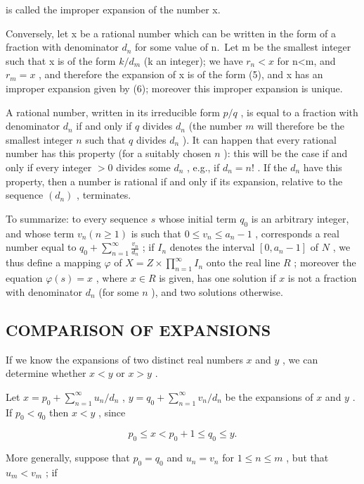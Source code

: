 is called the improper expansion of the number x.

Conversely, let x be a rational number which can be written in the form of a fraction with denominator \(d_{n}\) for some value of n.~Let m be the smallest integer such that x is of the form \(k/d_{m}\) (k an integer); we have \(r_{n}<x\) for n\textless m, and \(r_{m}=x\) , and therefore the expansion of x is of the form (5), and x has an improper expansion given by (6); moreover this improper expansion is unique.

A rational number, written in its irreducible form \(p / q\) , is equal to a fraction with denominator \(d_n\) if and only if \(q\) divides \(d_n\) (the number \(m\) will therefore be the smallest integer \(n\) such that \(q\) divides \(d_n\) ). It can happen that every rational number has this property (for a suitably chosen \(n\) ): this will be the case if and only if every integer \(> 0\) divides some \(d_n\) , e.g., if \(d_n = n!\) . If the \(d_n\) have this property, then a number is rational if and only if its expansion, relative to the sequence \((d_n)\) , terminates.

To summarize: to every sequence \(s\) whose initial term \(q_{0}\) is an arbitrary integer, and whose term \(v_{n}(n \geqslant 1)\) is such that \(0 \leqslant v_{n} \leqslant a_{n} - 1\) , corresponds a real number equal to \(q_{0} + \sum_{n=1}^{\infty} \frac{v_{n}}{d_{n}}\) ; if \(I_{n}\) denotes the interval \([0, a_{n} - 1]\) of \(N\) , we thus define a mapping \(\varphi\) of \(X = Z \times \prod_{n=1}^{\infty} I_{n}\) onto the real line \(R\) ; moreover the equation \(\varphi(s) = x\) , where \(x \in R\) is given, has one solution if \(x\) is not a fraction with denominator \(d_{n}\) (for some \(n\) ), and two solutions otherwise.

\subsection{COMPARISON OF EXPANSIONS}

If we know the expansions of two distinct real numbers \(x\) and \(y\) , we can determine whether \(x < y\) or \(x > y\) .

Let \(x = p_0 + \sum_{n=1}^{\infty} u_n / d_n\) , \(y = q_0 + \sum_{n=1}^{\infty} v_n / d_n\) be the expansions of \(x\) and \(y\) . If \(p_0 < q_0\) then \(x < y\) , since

\[
p _ {0} \leqslant x <   p _ {0} + 1 \leqslant q _ {0} \leqslant y.
\]

More generally, suppose that \(p_0 = q_0\) and \(u_n = v_n\) for \(1 \leqslant n \leqslant m\) , but that \(u_m < v_m\) ; if

